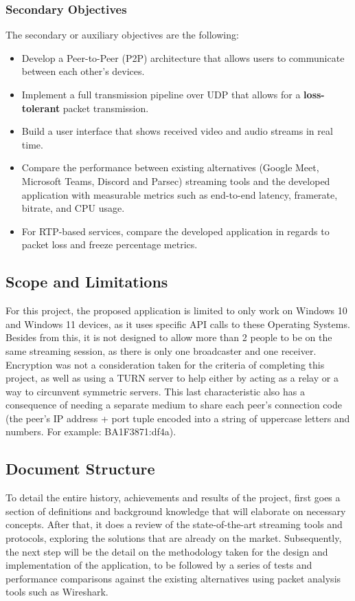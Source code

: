 \documentclass{article}
\begin{document}
\subsubsection{Secondary Objectives}
The secondary or auxiliary objectives are the following:
\begin{itemize}
    \item Develop a Peer-to-Peer (P2P) architecture that allows users to communicate between each other's devices.
    \item Implement a full transmission pipeline over UDP that allows for a \textbf{loss-tolerant} packet transmission.
    \item Build a user interface that shows received video and audio streams in real time.
    \item Compare the performance between existing alternatives (Google Meet, Microsoft Teams, Discord and Parsec) streaming tools and the developed application with measurable metrics such as end-to-end latency, framerate, bitrate, and CPU usage.
    \item For RTP-based services, compare the developed application in regards to packet loss and freeze percentage metrics. 
\end{itemize}

\subsection{Scope and Limitations}

For this project, the proposed application is limited to only work on Windows 10 and Windows 11 devices, as it uses specific API calls to these Operating Systems. Besides from this, it is not designed to allow more than 2 people to be on the same streaming session, as there is only one
broadcaster and one receiver. Encryption was not a consideration taken for the criteria of completing this project, as well as using a TURN server to help either by acting as a relay or a way to circunvent symmetric servers. This last characteristic also has a consequence of needing a separate 
medium to share each peer's connection code (the peer's IP address +  port tuple encoded into a string of uppercase letters and numbers. For example: BA1F3871:df4a). 

\subsection{Document Structure}
To detail the entire history, achievements and results of the project, first goes a section of definitions and background knowledge that will elaborate on necessary concepts. After that, it does a review of the state-of-the-art streaming tools and protocols, exploring the solutions that are already 
on the market. Subsequently, the next step will be the detail on the methodology taken for the design and implementation of the
application, to be followed by a series of tests and performance comparisons against the existing alternatives using packet analysis tools such as Wireshark.  
\end{document}
